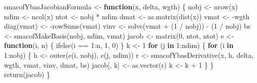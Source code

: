 \documentclass[
  12pt,
  letterpaper,
  DIV=11,
  numbers=noendperiod]{scrartcl}
\newenvironment{Shaded}{\begin{snugshade}}{\end{snugshade}}
\newcommand{\ControlFlowTok}[1]{\textcolor[rgb]{0.00,0.23,0.31}{\textbf{#1}}}
\newcommand{\DecValTok}[1]{\textcolor[rgb]{0.68,0.00,0.00}{#1}}
\newcommand{\FunctionTok}[1]{\textcolor[rgb]{0.28,0.35,0.67}{#1}}
\newcommand{\NormalTok}[1]{\textcolor[rgb]{0.00,0.23,0.31}{#1}}
\newcommand{\OtherTok}[1]{\textcolor[rgb]{0.00,0.23,0.31}{#1}}
\newcommand{\SpecialCharTok}[1]{\textcolor[rgb]{0.37,0.37,0.37}{#1}}
\begin{document}
\begin{Shaded}
\begin{Highlighting}[]
\NormalTok{smacofYbasJacobianFormula }\OtherTok{\textless{}{-}} \ControlFlowTok{function}\NormalTok{(x, delta, wgth) \{}
\NormalTok{  nobj }\OtherTok{\textless{}{-}} \FunctionTok{nrow}\NormalTok{(x)}
\NormalTok{  ndim }\OtherTok{\textless{}{-}} \FunctionTok{ncol}\NormalTok{(x)}
\NormalTok{  ntot }\OtherTok{\textless{}{-}}\NormalTok{ nobj }\SpecialCharTok{*}\NormalTok{ ndim}
\NormalTok{  dmat }\OtherTok{\textless{}{-}} \FunctionTok{as.matrix}\NormalTok{(}\FunctionTok{dist}\NormalTok{(x))}
\NormalTok{  vmat }\OtherTok{\textless{}{-}} \SpecialCharTok{{-}}\NormalTok{wgth}
  \FunctionTok{diag}\NormalTok{(vmat) }\OtherTok{\textless{}{-}} \SpecialCharTok{{-}}\FunctionTok{rowSums}\NormalTok{(vmat)}
\NormalTok{  vinv }\OtherTok{\textless{}{-}} \FunctionTok{solve}\NormalTok{(vmat }\SpecialCharTok{+}\NormalTok{ (}\DecValTok{1} \SpecialCharTok{/}\NormalTok{ nobj)) }\SpecialCharTok{{-}}\NormalTok{ (}\DecValTok{1} \SpecialCharTok{/}\NormalTok{ nobj)}
\NormalTok{  bs }\OtherTok{\textless{}{-}} \FunctionTok{smacofMakeBasis}\NormalTok{(nobj, ndim, vmat)}
\NormalTok{  jacob }\OtherTok{\textless{}{-}} \FunctionTok{matrix}\NormalTok{(}\DecValTok{0}\NormalTok{, ntot, ntot)}
\NormalTok{  e }\OtherTok{\textless{}{-}} \ControlFlowTok{function}\NormalTok{(i, n) \{}
    \FunctionTok{ifelse}\NormalTok{(i }\SpecialCharTok{==} \DecValTok{1}\SpecialCharTok{:}\NormalTok{n, }\DecValTok{1}\NormalTok{, }\DecValTok{0}\NormalTok{)}
\NormalTok{  \}}
\NormalTok{  k }\OtherTok{\textless{}{-}} \DecValTok{1}
  \ControlFlowTok{for}\NormalTok{ (j }\ControlFlowTok{in} \DecValTok{1}\SpecialCharTok{:}\NormalTok{ndim) \{}
    \ControlFlowTok{for}\NormalTok{ (i }\ControlFlowTok{in} \DecValTok{1}\SpecialCharTok{:}\NormalTok{nobj) \{}
\NormalTok{      h }\OtherTok{\textless{}{-}} \FunctionTok{outer}\NormalTok{(}\FunctionTok{e}\NormalTok{(i, nobj), }\FunctionTok{e}\NormalTok{(j, ndim))}
\NormalTok{      r }\OtherTok{\textless{}{-}} \FunctionTok{smacofYbasDerivative}\NormalTok{(x, h, delta, wgth, vmat, vinv, dmat, bs)}
\NormalTok{      jacob[, k] }\OtherTok{\textless{}{-}} \FunctionTok{as.vector}\NormalTok{(r)}
\NormalTok{      k }\OtherTok{\textless{}{-}}\NormalTok{ k }\SpecialCharTok{+} \DecValTok{1}
\NormalTok{    \}}
\NormalTok{  \}}
  \FunctionTok{return}\NormalTok{(jacob)}
\NormalTok{\}}


\end{Highlighting}
\end{Shaded}
\end{document}
